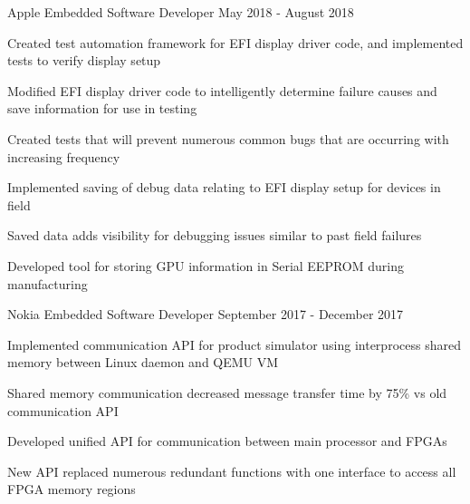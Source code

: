 \begin{cventries}
  \cventry
    {Apple} %
    {Embedded Software Developer} %
    {May 2018 - August 2018} %
    {}
    {
      \begin{cvitems} %
        \item {Created test automation framework for EFI display driver code, and implemented tests to verify display setup}
        \item {Modified EFI display driver code to intelligently determine failure causes and save information for use in testing}
        \item {Created tests that will prevent numerous common bugs that are occurring with increasing frequency}
        \item {Implemented saving of debug data relating to EFI display setup for devices in field}
        \item {Saved data adds visibility for debugging issues similar to past field failures}
        \item {Developed tool for storing GPU information in Serial EEPROM during manufacturing}
      \end{cvitems}
    }

  \cventry
    {Nokia} %
    {Embedded Software Developer} %
    {September 2017 - December 2017} %
    {}
    {
      \begin{cvitems} %
        \item {Implemented communication API for product simulator using interprocess shared memory between Linux daemon and QEMU VM}
        \item {Shared memory communication decreased message transfer time by 75\% vs old communication API}
        \item {Developed unified API for communication between main processor and FPGAs}
        \item {New API replaced numerous redundant functions with one interface to access all FPGA memory regions}
      \end{cvitems}
    }


\end{cventries}
